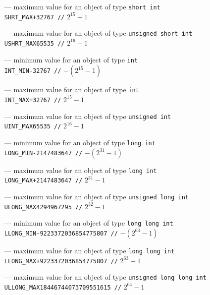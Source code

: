\begin{itemize}
\item[---] maximum value for an object of type \texttt{short int}\\
\texttt{SHRT\_MAX}\hfil\hspace*{2cm}\texttt{+32767 //} $2^{15} - 1$
\item[---] maximum value for an object of type \texttt{unsigned short int}\\
\texttt{USHRT\_MAX}\hfil\hspace*{2cm}\texttt{65535 //} $2^{16} - 1$
\item[---] minimum value for an object of type \texttt{int}\\
\texttt{INT\_MIN}\hfil\hspace*{2cm}\texttt{-32767 //} $-(2^{15} - 1)$
\item[---] maximum value for an object of type \texttt{int}\\
\texttt{INT\_MAX}\hfil\hspace*{2cm}\texttt{+32767 //} $2^{15} - 1$
\item[---] maximum value for an object of type \texttt{unsigned int}\\
\texttt{UINT\_MAX}\hfil\hspace*{2cm}\texttt{65535 //} $2^{16} - 1$
\item[---] minimum value for an object of type \texttt{long int}\\
\texttt{LONG\_MIN}\hfil\hspace*{2cm}\texttt{-2147483647 //} $-(2^{31} - 1)$
\item[---] maximum value for an object of type \texttt{long int}\\
\texttt{LONG\_MAX}\hfil\hspace*{2cm}\texttt{+2147483647 //} $2^{31} - 1$
\item[---] maximum value for an object of type \texttt{unsigned long int}\\
\texttt{ULONG\_MAX}\hfil\hspace*{2cm}\texttt{4294967295 //} $2^{32} - 1$
\item[---] minimum value for an object of type \texttt{long long int}\\
\texttt{LLONG\_MIN}\hfil\hspace*{2cm}\texttt{-9223372036854775807 //} $-(2^{63} - 1)$
\item[---] maximum value for an object of type \texttt{long long int}\\
\texttt{LLONG\_MAX}\hfil\hspace*{2cm}\texttt{+9223372036854775807 //} $2^{63} - 1$
\item[---] maximum value for an object of type \texttt{unsigned long long int}\\
\texttt{ULLONG\_MAX}\hfil\hspace*{2cm}\texttt{18446744073709551615 //} $2^{64} - 1$
\end{itemize}

